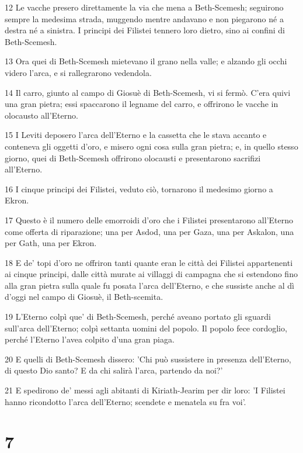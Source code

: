 \par 12 Le vacche presero direttamente la via che mena a Beth-Scemesh; seguirono sempre la medesima strada, muggendo mentre andavano e non piegarono né a destra né a sinistra. I principi dei Filistei tennero loro dietro, sino ai confini di Beth-Scemesh.
\par 13 Ora quei di Beth-Scemesh mietevano il grano nella valle; e alzando gli occhi videro l'arca, e si rallegrarono vedendola.
\par 14 Il carro, giunto al campo di Giosuè di Beth-Scemesh, vi si fermò. C'era quivi una gran pietra; essi spaccarono il legname del carro, e offrirono le vacche in olocausto all'Eterno.
\par 15 I Leviti deposero l'arca dell'Eterno e la cassetta che le stava accanto e conteneva gli oggetti d'oro, e misero ogni cosa sulla gran pietra; e, in quello stesso giorno, quei di Beth-Scemesh offrirono olocausti e presentarono sacrifizi all'Eterno.
\par 16 I cinque principi dei Filistei, veduto ciò, tornarono il medesimo giorno a Ekron.
\par 17 Questo è il numero delle emorroidi d'oro che i Filistei presentarono all'Eterno come offerta di riparazione; una per Asdod, una per Gaza, una per Askalon, una per Gath, una per Ekron.
\par 18 E de' topi d'oro ne offriron tanti quante eran le città dei Filistei appartenenti ai cinque principi, dalle città murate ai villaggi di campagna che si estendono fino alla gran pietra sulla quale fu posata l'arca dell'Eterno, e che sussiste anche al dì d'oggi nel campo di Giosuè, il Beth-scemita.
\par 19 L'Eterno colpì que' di Beth-Scemesh, perché aveano portato gli sguardi sull'arca dell'Eterno; colpì settanta uomini del popolo. Il popolo fece cordoglio, perché l'Eterno l'avea colpito d'una gran piaga.
\par 20 E quelli di Beth-Scemesh dissero: 'Chi può sussistere in presenza dell'Eterno, di questo Dio santo? E da chi salirà l'arca, partendo da noi?'
\par 21 E spedirono de' messi agli abitanti di Kiriath-Jearim per dir loro: 'I Filistei hanno ricondotto l'arca dell'Eterno; scendete e menatela su fra voi'.

\chapter{7}

